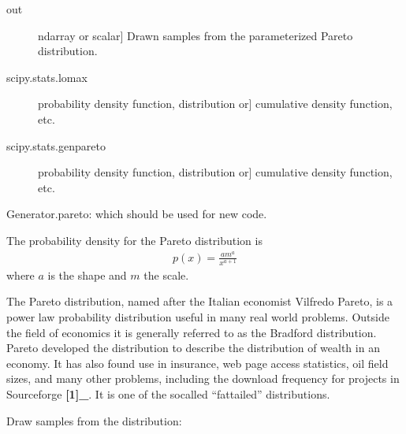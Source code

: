 \documentclass[letterpaper,10pt,english]{sphinxmanual}
\begin{document}
\begin{fulllineitems}
\begin{description}
\end{description}
\begin{description}
\item[{out}] \leavevmode{[}ndarray or scalar{]}
Drawn samples from the parameterized Pareto distribution.

\end{description}
\begin{description}
\item[{scipy.stats.lomax}] \leavevmode{[}probability density function, distribution or{]}
cumulative density function, etc.

\item[{scipy.stats.genpareto}] \leavevmode{[}probability density function, distribution or{]}
cumulative density function, etc.

\end{description}

Generator.pareto: which should be used for new code.

The probability density for the Pareto distribution is
\begin{equation*}
\begin{split}p(x) = \frac{am^a}{x^{a+1}}\end{split}
\end{equation*}
where \(a\) is the shape and \(m\) the scale.

The Pareto distribution, named after the Italian economist
Vilfredo Pareto, is a power law probability distribution
useful in many real world problems.  Outside the field of
economics it is generally referred to as the Bradford
distribution. Pareto developed the distribution to describe
the distribution of wealth in an economy.  It has also found
use in insurance, web page access statistics, oil field sizes,
and many other problems, including the download frequency for
projects in Sourceforge {\color{red}\bfseries{}{[}1{]}\_}.  It is one of the so\sphinxhyphen{}called
“fat\sphinxhyphen{}tailed” distributions.

Draw samples from the distribution:

\begin{sphinxVerbatim}[commandchars=\\\{\}]
      
       
\end{sphinxVerbatim}


\end{fulllineitems}
\end{document}
